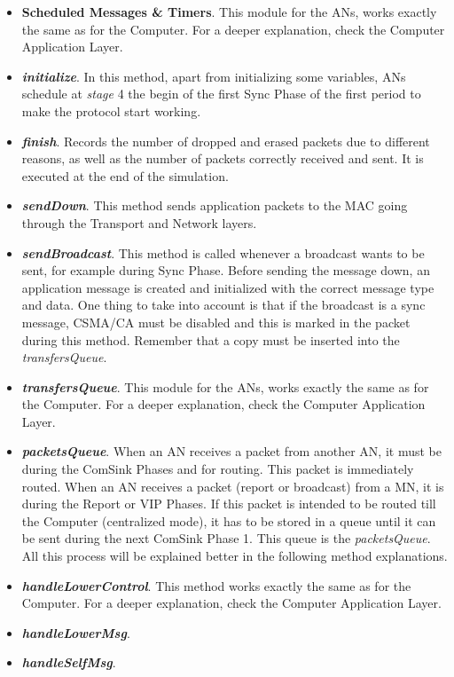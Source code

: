 \begin{itemize}
 \item \textbf{Scheduled Messages \& Timers}. This module for the \acp{AN}, works exactly the same as for the Computer. For a deeper explanation, check
the Computer Application Layer.

 \item \textbf{\textit{initialize}}. In this method, apart from initializing some variables, \acp{AN} schedule at \textit{stage} 4 the begin of 
the first Sync Phase of the first period to make the protocol start working.

 \item \textbf{\textit{finish}}. Records the number of dropped and erased packets due to different reasons, as well as the number of packets
correctly received and sent. It is executed at the end of the simulation.

 \item \textbf{\textit{sendDown}}. This method sends application packets to the \ac{MAC} going through the Transport and Network layers.

 \item \textbf{\textit{sendBroadcast}}. This method is called whenever a broadcast wants to be sent, for example during Sync Phase. Before sending
the message down, an application message is created and initialized with the correct message type and data. One thing to take into account is that
if the broadcast is a sync message, \ac{CSMA/CA} must be disabled and this is marked in the packet during this method. Remember that a copy must 
be inserted into the \textit{transfersQueue}.

 \item \textbf{\textit{transfersQueue}}. This module for the \acp{AN}, works exactly the same as for the Computer. For a deeper explanation, check
the Computer Application Layer.

 \item \textbf{\textit{packetsQueue}}. When an \ac{AN} receives a packet from another \ac{AN}, it must be during the ComSink Phases and for 
routing. This packet is immediately routed. When an \ac{AN} receives a packet (report or broadcast) from a \ac{MN}, it is during the
Report or \ac{VIP} Phases. If this packet is intended to be routed till the Computer (centralized mode), it has to be stored in a queue until
it can be sent during the next ComSink Phase 1. This queue is the \textit{packetsQueue}. All this process will be explained better in the 
following method explanations.

 \item \textbf{\textit{handleLowerControl}}. This method works exactly the same as for the Computer. For a deeper explanation, check the Computer 
Application Layer.

 \item \textbf{\textit{handleLowerMsg}}.

 \item \textbf{\textit{handleSelfMsg}}.

\end{itemize}


